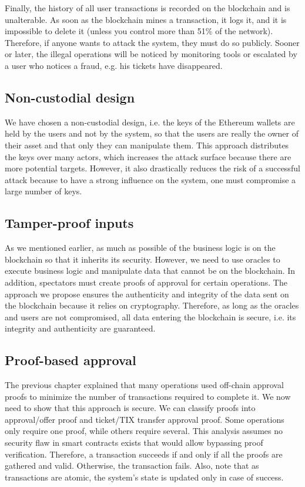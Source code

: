 \documentclass[a4paper,11pt,oneside]{report}
\begin{document}
Finally, the history of all user transactions is recorded on the blockchain and is unalterable. As soon as the blockchain mines a transaction, it logs it, and it is impossible to delete it (unless you control more than 51\% of the network). Therefore, if anyone wants to attack the system, they must do so publicly. Sooner or later, the illegal operations will be noticed by monitoring tools or escalated by a user who notices a fraud, e.g. his tickets have disappeared.

\subsection{Non-custodial design}
We have chosen a non-custodial design, i.e. the keys of the Ethereum wallets are held by the users and not by the system, so that the users are really the owner of their asset and that only they can manipulate them. This approach distributes the keys over many actors, which increases the attack surface because there are more potential targets. However, it also drastically reduces the risk of a successful attack because to have a strong influence on the system, one must compromise a large number of keys.

\subsection{Tamper-proof inputs}
As we mentioned earlier, as much as possible of the business logic is on the blockchain so that it inherits its security. However, we need to use oracles to execute business logic and manipulate data that cannot be on the blockchain. In addition, spectators must create proofs of approval for certain operations. The approach we propose ensures the authenticity and integrity of the data sent on the blockchain because it relies on cryptography. Therefore, as long as the oracles and users are not compromised, all data entering the blockchain is secure, i.e. its integrity and authenticity are guaranteed.

\subsection{Proof-based approval}
The previous chapter explained that many operations used off-chain approval proofs to minimize the number of transactions required to complete it. We now need to show that this approach is secure. We can classify proofs into approval/offer proof and ticket/TIX transfer approval proof. Some operations only require one proof, while others require several. This analysis assumes no security flaw in smart contracts exists that would allow bypassing proof verification. Therefore, a transaction succeeds if and only if all the proofs are gathered and valid. Otherwise, the transaction fails. Also, note that as transactions are atomic, the system's state is updated only in case of success.
\end{document}
